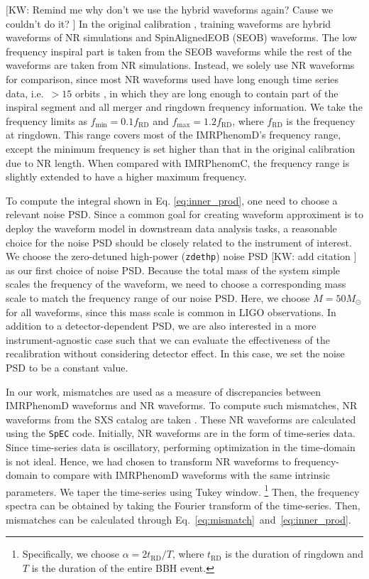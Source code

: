 \documentclass[twocolumn]{aastex631}
\newcommand{\zdethp}{\texttt{zdethp}}
\newcommand{\kw}[1]{{\color{rb4}[KW: #1 ]}}
\begin{document}
\kw{Remind me why don't we use the hybrid waveforms again? Cause we couldn't do it?}
In the original calibration \citep{khan2016frequency,husa2016frequency},
training waveforms are hybrid waveforms of NR simulations and SpinAlignedEOB
(SEOB) waveforms. The low frequency inspiral part is taken from the SEOB
waveforms while the rest of the waveforms are taken from NR simulations.
Instead, we solely use NR waveforms for comparison, since most NR waveforms used
have long enough time series data, i.e.~$>15$ orbits \citep{boyle2019sxs}, in
which they are long enough to contain part of the inspiral segment and all
merger and ringdown frequency information. We take the frequency limits as
$f_{\mathrm{min}}=0.1f_{\mathrm{RD}}$ and $f_{\mathrm{max}}=1.2f_{\mathrm{RD}}$,
where $f_{\mathrm{RD}}$ is the frequency at ringdown. This range covers most of
the IMRPhenomD's frequency range, except the minimum frequency is set higher
than that in the original calibration due to NR length. When compared with
IMRPhenomC, the frequency range is slightly extended to have a higher maximum
frequency. 

To compute the integral shown in Eq. \ref{eq:inner_prod}, one need to choose a
relevant noise PSD. Since a common goal for creating waveform approximent is to
deploy the waveform model in downstream data analysis tasks, a reasonable choice
for the noise PSD should be closely related to the instrument of interest. We
choose the zero-detuned high-power (\zdethp) noise PSD \kw{add citation} as our
first choice of noise PSD. Because the total mass of the system simple scales
the frequency of the waveform, we need to choose a corresponding mass scale to
match the frequency range of our noise PSD. Here, we choose $M=50M_{\odot}$ for
all waveforms, since this mass scale is common in LIGO observations. In addition
to a detector-dependent PSD, we are also interested in a more
instrument-agnostic case such that we can evaluate the effectiveness of the
recalibration without considering detector effect. In this case, we set the
noise PSD to be a constant value. 

In our work, mismatches are used as a measure of discrepancies between
IMRPhenomD waveforms and NR waveforms. To compute such mismatches, NR waveforms
from the SXS catalog are taken \citep{boyle2019sxs}. These NR waveforms are
calculated using the \texttt{SpEC} code. Initially, NR waveforms are in the form
of time-series data. Since time-series data is oscillatory, performing
optimization in the time-domain is not ideal. Hence, we had chosen to transform
NR waveforms to frequency-domain to compare with IMRPhenomD waveforms with the
same intrinsic parameters. We taper the time-series using Tukey window.
\footnote{ Specifically, we choose $\alpha=2t_{\mathrm{RD}}/T$, where
$t_{\mathrm{RD}}$ is the duration of ringdown and $T$ is the duration of the
entire BBH event. } Then, the frequency spectra can be obtained by taking the
Fourier transform of the time-series. Then, mismatches can be calculated through
Eq.~\ref{eq:mismatch}~and~\ref{eq:inner_prod}. 
\end{document}
